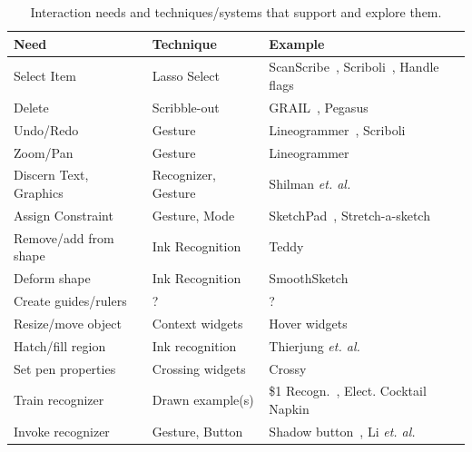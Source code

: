 \documentclass[11pt]{article}
\begin{document}
\begin{table}[h]
\begin{center}
\small{
\begin{tabular}{|l|l|l|}
\hline
\textbf{Need} & \textbf{Technique} &  \textbf{Example} \\
\hline \hline

Select Item & Lasso Select & ScanScribe~\cite{saund-scanscribe},
Scriboli~\cite{hinckley-scriboli}, Handle
flags~\cite{grossman-handle-flag}\\

Delete & Scribble-out & GRAIL~\cite{ellis-grail},
Pegasus~\cite{igarashi-pegasus} \\

Undo/Redo & Gesture & Lineogrammer~\cite{zeleznik-lineogrammer},
Scriboli~\cite{hinckley-scriboli}\\

Zoom/Pan & Gesture & Lineogrammer~\cite{zeleznik-lineogrammer}\\

Discern Text, Graphics & Recognizer, Gesture & Shilman
\textit{et. al.}~\cite{shilman-discerning-structure} \\

Assign Constraint & Gesture, Mode &
SketchPad~\cite{sutherland-sketchpad},
Stretch-a-sketch~\cite{gross-stretch-a-sketch}\\

Remove/add from shape & Ink Recognition & Teddy~\cite{igarashi-teddy} \\

Deform shape & Ink Recognition & SmoothSketch~\cite{karpenko-smoothsketch} \\

Create guides/rulers & ? & ? \\

Resize/move object & Context widgets & Hover widgets~\cite{grossman-hover-widgets} \\

Hatch/fill region & Ink recognition & Thierjung \textit{et. al.}~\cite{thierjung-hatching} \\

Set pen properties & Crossing widgets & Crossy~\cite{apitz-crossy} \\

Train recognizer & Drawn example(s) & \$1 Recogn.~\cite{wobbrock-dollar},
Elect. Cocktail Napkin~\cite{gross-ecn-uist} \\

Invoke recognizer & Gesture, Button & Shadow
button~\cite{marinkas-shadowbutton}, Li
\textit{et. al.}~\cite{li-mode-switching}\\

\hline
\end{tabular}}
\end{center}
\caption{Interaction needs and techniques/systems that support and
  explore them.}
\label{tab:sketch-needs}
\end{table}%
\end{document}
